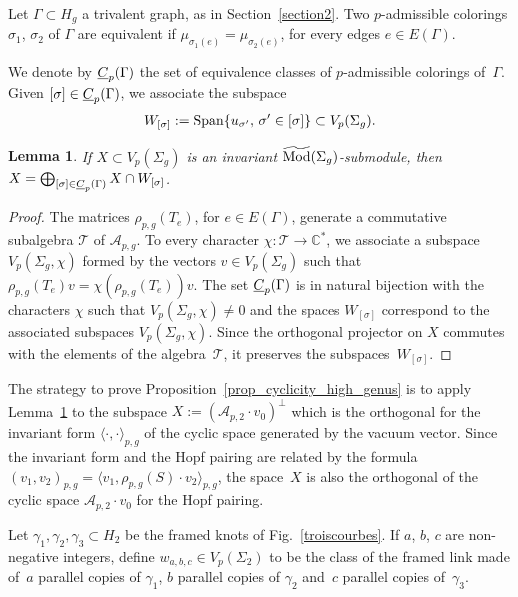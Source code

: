 \documentclass[pdftex]{sigma}
\numberwithin{equation}{section}
\newtheorem{Lemma}[Theorem]{Lemma}
\begin{document}
Let $\Gamma\subset H_g$ a trivalent graph, as in Section~\ref{section2}. Two $p$-admissible colorings $\sigma_1$, $\sigma_2$ of $\Gamma$ are equivalent if $\mu_{\sigma_1(e)}=\mu_{\sigma_2(e)}$, for every edges $e \in E(\Gamma)$.

We denote by $\underline{C}_p(\Gamma)$ the set of equivalence classes of $p$-admissible colorings of~$\Gamma$. Given $[\sigma]\in \underline{C}_p(\Gamma)$, we associate the subspace
\begin{gather*} W_{[\sigma]} := \operatorname{Span} \{ u_{\sigma'},\, \sigma'\in [\sigma] \} \subset V_p(\Sigma_g). \end{gather*}

\begin{Lemma}\label{lemma1}If $X\subset V_p(\Sigma_g)$ is an invariant $\widetilde{\operatorname{Mod}}(\Sigma_g)$-submodule, then $ X=\bigoplus_{[\sigma]\in \underline{C}_p(\Gamma)} X\cap W_{[\sigma]}$.
\end{Lemma}

\begin{proof} The matrices $\rho_{p,g}(T_e)$, for $e\in E(\Gamma)$, generate a commutative subalgebra $\mathcal{T}$ of $\mathcal{A}_{p,g}$. To every character $\chi \colon \mathcal{T}\rightarrow \mathbb{C}^*$, we associate a subspace $V_p(\Sigma_g, \chi)$ formed by the vectors $v\in V_p(\Sigma_g)$ such that $\rho_{p,g}(T_e)v=\chi(\rho_{p,g}(T_e))v$. The set $\underline{C}_p(\Gamma)$ is in natural bijection with the characters $\chi$ such that $V_p(\Sigma_g,\chi)\neq 0$ and the spaces $W_{[\sigma]}$ correspond to the associated subspaces $V_p(\Sigma_g, \chi)$. Since the orthogonal projector on $X$ commutes with the elements of the algebra~$\mathcal{T}$, it preserves the subspaces~$W_{[\sigma]}$.
\end{proof}

The strategy to prove Proposition~\ref{prop_cyclicity_high_genus} is to apply Lemma~\ref{lemma1} to the subspace $ X:= ( \mathcal{A}_{p,2}\cdot v_0 ) ^{\bot}$ which is the orthogonal for the invariant form $\langle \cdot, \cdot \rangle_{p,g}$ of the cyclic space generated by the vacuum vector. Since the invariant form and the Hopf pairing are related by the formula $(v_1, v_2)_{p,g}=\langle v_1, \rho_{p,g}(S)\cdot v_2\rangle_{p,g}$, the space~$X$ is also the orthogonal of the cyclic space $\mathcal{A}_{p,2}\cdot v_0$ for the Hopf pairing.

Let $\gamma_1, \gamma_2, \gamma_3 \subset H_2$ be the framed knots of Fig.~\ref{troiscourbes}. If $a$, $b$, $c$ are non-negative integers, define $w_{a,b,c}\in V_p(\Sigma_2)$ to be the class of the framed link made of~$a$ parallel copies of $\gamma_1$, $b$ parallel copies of $\gamma_2$ and~$c$ parallel copies of~$\gamma_3$.
\end{document}
